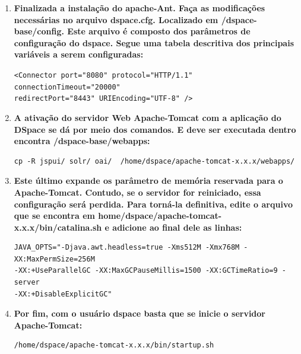 \documentclass[12pt,hidelinks]{article}
\begin{document}
\begin{enumerate}
        
        \newpage

        \item \textbf{Finalizada a instalação do apache-Ant. Faça as modificações necessárias no arquivo dspace.cfg. Localizado em /dspace-base/config. Este arquivo é composto dos parâmetros de configuração do dspace. Segue uma tabela descritiva dos principais variáveis a serem configuradas:}
        
            \texttt{<Connector port="8080" protocol="HTTP/1.1"\\
                    connectionTimeout="20000"\\
                    redirectPort="8443" URIEncoding="UTF-8" />}\\
            
        
        \item \textbf{A ativação do servidor Web Apache-Tomcat com a aplicação do DSpace se dá por meio dos comandos. E deve ser executada dentro encontra /dspace-base/webapps:}\\
            
         \begin{verbatim}
cp -R jspui/ solr/ oai/  /home/dspace/apache-tomcat-x.x.x/webapps/
         \end{verbatim}
         
          \item \textbf{Este último expande os parâmetro de memória reservada para o Apache-Tomcat. Contudo, se o servidor for reiniciado, essa configuração será perdida. Para torná-la definitiva, edite o arquivo que se encontra em home/dspace/apache-tomcat-x.x.x/bin/catalina.sh e adicione ao final dele as linhas:}\\
          
            \begin{verbatim}
JAVA_OPTS="-Djava.awt.headless=true -Xms512M -Xmx768M -XX:MaxPermSize=256M 
-XX:+UseParallelGC -XX:MaxGCPauseMillis=1500 -XX:GCTimeRatio=9 -server
-XX:+DisableExplicitGC"
            \end{verbatim}
         
         \item \textbf{Por fim, com o usuário dspace basta que se inicie o servidor Apache-Tomcat:}\\

            \begin{verbatim}
/home/dspace/apache-tomcat-x.x.x/bin/startup.sh
            \end{verbatim}
            

\end{enumerate}
\end{document}
